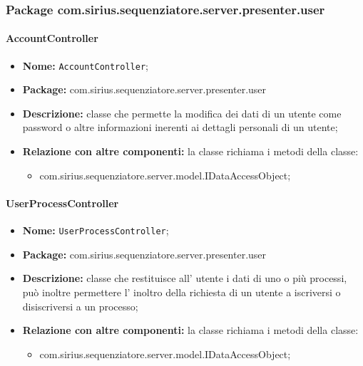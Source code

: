 \subsubsection{Package com.sirius.sequenziatore.server.presenter.user}
\paragraph{AccountController}
	\begin{itemize}
		\item \textbf{Nome:} \texttt{AccountController};
		\item \textbf{Package:} com.sirius.sequenziatore.server.presenter.user
		\item \textbf{Descrizione:} classe che permette la modifica dei dati di un utente come password o altre informazioni inerenti ai dettagli personali di un utente;
		\item \textbf{Relazione con altre componenti:} la classe richiama i metodi della classe:
		\begin{itemize}
			\item com.sirius.sequenziatore.server.model.IDataAccessObject;
		\end{itemize}
	\end{itemize}
\paragraph{UserProcessController}
	\begin{itemize}
		\item \textbf{Nome:} \texttt{UserProcessController};
		\item \textbf{Package:} com.sirius.sequenziatore.server.presenter.user
		\item \textbf{Descrizione:} classe che restituisce all' utente i dati di uno o più processi, può inoltre permettere l' inoltro della richiesta di un utente a iscriversi o disiscriversi a un processo;
		\item \textbf{Relazione con altre componenti:} la classe richiama i metodi della classe:
		\begin{itemize}
			\item com.sirius.sequenziatore.server.model.IDataAccessObject;
		\end{itemize}
	\end{itemize}

